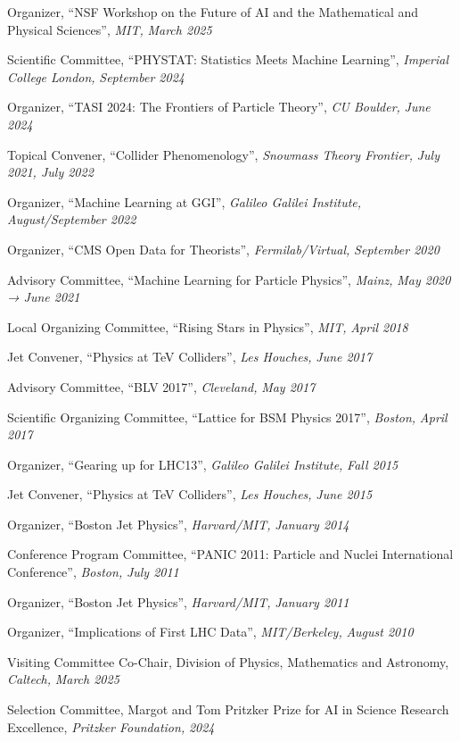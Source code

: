\item Organizer, ``NSF Workshop on the Future of AI and the Mathematical and Physical Sciences'', \emph{MIT, }\emph{March 2025}
\item Scientific Committee, ``PHYSTAT: Statistics Meets Machine Learning'', \emph{Imperial College London, }\emph{September 2024}
\item Organizer, ``TASI 2024: The Frontiers of Particle Theory'', \emph{CU Boulder, }\emph{June 2024}
\item Topical Convener, ``Collider Phenomenology'', \emph{Snowmass Theory Frontier, }\emph{July 2021, July 2022}
\item Organizer, ``Machine Learning at GGI'', \emph{Galileo Galilei Institute, }\emph{August/September 2022}
\item Organizer, ``CMS Open Data for Theorists'', \emph{Fermilab/Virtual, }\emph{September 2020}
\item Advisory Committee, ``Machine Learning for Particle Physics'', \emph{Mainz, }\emph{May 2020 → June 2021}
\item Local Organizing Committee, ``Rising Stars in Physics'', \emph{MIT, }\emph{April 2018}
\item Jet Convener, ``Physics at TeV Colliders'', \emph{Les Houches, }\emph{June 2017}
\item Advisory Committee, ``BLV 2017'', \emph{Cleveland, }\emph{May 2017}
\item Scientific Organizing Committee, ``Lattice for BSM Physics 2017'', \emph{Boston, }\emph{April 2017}
\item Organizer, ``Gearing up for LHC13'', \emph{Galileo Galilei Institute, }\emph{Fall 2015}
\item Jet Convener, ``Physics at TeV Colliders'', \emph{Les Houches, }\emph{June 2015}
\item Organizer, ``Boston Jet Physics'', \emph{Harvard/MIT, }\emph{January 2014}
\item Conference Program Committee, ``PANIC 2011: Particle and Nuclei International Conference'', \emph{Boston, }\emph{July 2011}
\item Organizer, ``Boston Jet Physics'', \emph{Harvard/MIT, }\emph{January 2011}
\item Organizer, ``Implications of First LHC Data'', \emph{MIT/Berkeley, }\emph{August 2010}
\item Visiting Committee Co-Chair, Division of Physics, Mathematics and Astronomy, \emph{Caltech, }\emph{March 2025}
\item Selection Committee, Margot and Tom Pritzker Prize for AI in Science Research Excellence, \emph{Pritzker Foundation, }\emph{2024}
